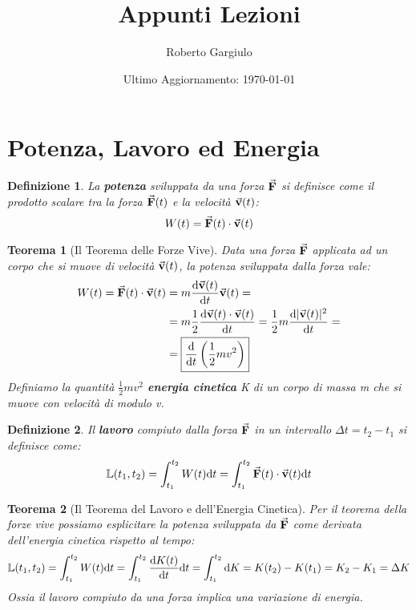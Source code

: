 \documentclass{article}
\title{Appunti Lezioni}
\author{Roberto Gargiulo}
\date{Ultimo Aggiornamento: \today}
\newtheorem{thm}{Teorema}[section]
\newtheorem{defn}{Definizione}[section]
\renewcommand{\v}{\va{v}}
\newcommand{\F}{\va{F}}
\begin{document}
\maketitle


\section{Potenza, Lavoro ed Energia }
\begin{defn}
La \textbf{potenza} sviluppata da una forza $\F$ si definisce come il prodotto scalare tra la forza $\F(t)$ e la velocità $\v(t)$:
\[W(t)=\F(t)\cdot\v(t)\]
\end{defn}

\begin{thm}[Il Teorema delle Forze Vive]
Data una forza $\F$ applicata ad un corpo che si muove di velocità $\v(t)$, la potenza sviluppata dalla forza vale:
\begin{equation}
\begin{split}
    W(t)=\F(t)\cdot\v(t)&=m\dv{\v(t)}{t}\v(t)=\\
    &=m\frac{1}{2}\dv{\v(t)\cdot\v(t)}{t}=\frac{1}{2}m\dv{|\v(t)|^2}{t}=\\
    &=\boxed{\dv{t}\left(\frac{1}{2}mv^2\right)}
\end{split}    
\end{equation}
Definiamo la quantità $\frac{1}{2}mv^2$ \textbf{energia cinetica} K di un corpo di massa m che si muove con velocità di modulo v.
\end{thm}
\begin{defn}
Il \textbf{lavoro} compiuto dalla forza $\F$ in un intervallo $\Delta t=t_2-t_1$ si definisce come:
\begin{equation}
    \mathbb{L}(t_1,t_2)=\int_{t_1}^{t_2}W(t)\dd t=\int_{t_1}^{t_2}\F(t)\cdot\v(t)\dd t
\end{equation}
\end{defn}
\begin{thm}[Il Teorema del Lavoro e dell'Energia Cinetica]
Per il teorema della forze vive possiamo esplicitare la potenza sviluppata da $\F$ come derivata dell'energia cinetica rispetto al tempo:
\begin{equation}
    \mathbb{L}(t_1,t_2)=\int_{t_1}^{t_2}W(t)\dd t=\int_{t_1}^{t_2}\dv{K(t)}{t}\dd t=\int_{t_1}^{t_2}\dd K=K(t_2)-K(t_1)=K_2-K_1=\Delta K
\end{equation}
Ossia il lavoro compiuto da una forza implica una variazione di energia.
\end{thm}
\end{document}
